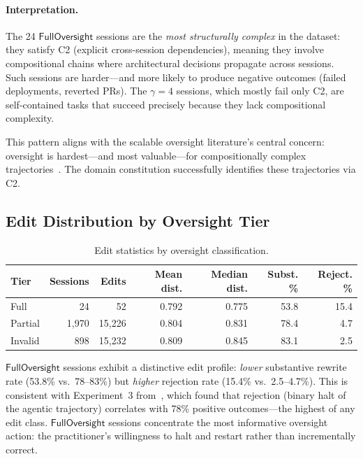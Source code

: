 \documentclass[11pt]{article}
\begin{document}
\paragraph{Interpretation.}
The 24 $\mathsf{FullOversight}$ sessions are the \emph{most structurally complex} in the dataset: they satisfy C2 (explicit cross-session dependencies), meaning they involve compositional chains where architectural decisions propagate across sessions.
Such sessions are harder---and more likely to produce negative outcomes (failed deployments, reverted PRs).
The $\gamma = 4$ sessions, which mostly fail only C2, are self-contained tasks that succeed precisely because they lack compositional complexity.

This pattern aligns with the scalable oversight literature's central concern: oversight is hardest---and most valuable---for compositionally complex trajectories~\citep{bowman2022measuring}.
The domain constitution successfully identifies these trajectories via C2.

\subsection{Edit Distribution by Oversight Tier}
\label{sec:edit-by-tier}

\begin{table}[ht]
\centering
\caption{Edit statistics by oversight classification.}
\label{tab:edit-by-tier}
\begin{tabular}{@{}lrrrrrr@{}}
\toprule
\textbf{Tier} & \textbf{Sessions} & \textbf{Edits} & \textbf{Mean dist.} & \textbf{Median dist.} & \textbf{Subst. \%} & \textbf{Reject. \%} \\
\midrule
Full    &    24 &     52 & 0.792 & 0.775 & 53.8 & 15.4 \\
Partial & 1{,}970 & 15{,}226 & 0.804 & 0.831 & 78.4 & 4.7 \\
Invalid &   898 & 15{,}232 & 0.809 & 0.845 & 83.1 & 2.5 \\
\bottomrule
\end{tabular}
\end{table}

$\mathsf{FullOversight}$ sessions exhibit a distinctive edit profile: \emph{lower} substantive rewrite rate (53.8\% vs.\ 78--83\%) but \emph{higher} rejection rate (15.4\% vs.\ 2.5--4.7\%).
This is consistent with Experiment~3 from~\citet{ovcharov2026edittrace}, which found that rejection (binary halt of the agentic trajectory) correlates with 78\% positive outcomes---the highest of any edit class.
$\mathsf{FullOversight}$ sessions concentrate the most informative oversight action: the practitioner's willingness to halt and restart rather than incrementally correct.
\end{document}

